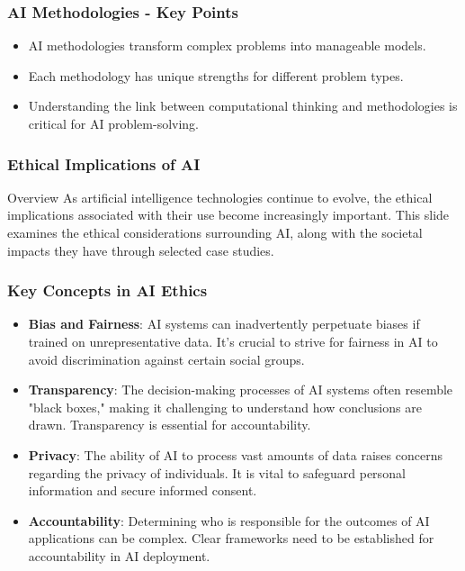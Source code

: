 \documentclass{beamer}
\begin{document}
\begin{frame}[fragile]
    \frametitle{AI Methodologies - Key Points}
    \begin{itemize}
        \item AI methodologies transform complex problems into manageable models.
        \item Each methodology has unique strengths for different problem types.
        \item Understanding the link between computational thinking and methodologies is critical for AI problem-solving.
    \end{itemize}
\end{frame}

\begin{frame}[fragile]
    \frametitle{Ethical Implications of AI}
    \begin{block}{Overview}
        As artificial intelligence technologies continue to evolve, the ethical implications associated with their use become increasingly important. This slide examines the ethical considerations surrounding AI, along with the societal impacts they have through selected case studies.
    \end{block}
\end{frame}

\begin{frame}[fragile]
    \frametitle{Key Concepts in AI Ethics}
    \begin{itemize}
        \item \textbf{Bias and Fairness}: 
        AI systems can inadvertently perpetuate biases if trained on unrepresentative data. It's crucial to strive for fairness in AI to avoid discrimination against certain social groups.

        \item \textbf{Transparency}: 
        The decision-making processes of AI systems often resemble "black boxes," making it challenging to understand how conclusions are drawn. Transparency is essential for accountability.

        \item \textbf{Privacy}: 
        The ability of AI to process vast amounts of data raises concerns regarding the privacy of individuals. It is vital to safeguard personal information and secure informed consent.

        \item \textbf{Accountability}: 
        Determining who is responsible for the outcomes of AI applications can be complex. Clear frameworks need to be established for accountability in AI deployment.
    \end{itemize}
\end{frame}
\end{document}
